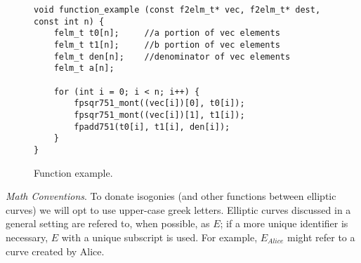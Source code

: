 \begin{figure}[!h]
\label{code:pbinv}
\begin{lstlisting}
void function_example (const f2elm_t* vec, f2elm_t* dest, const int n) {
	felm_t t0[n];     //a portion of vec elements
	felm_t t1[n];     //b portion of vec elements
	felm_t den[n];    //denominator of vec elements
	felm_t a[n];

	for (int i = 0; i < n; i++) {
		fpsqr751_mont((vec[i])[0], t0[i]);
		fpsqr751_mont((vec[i])[1], t1[i]);
		fpadd751(t0[i], t1[i], den[i]);
	}	
}
\end{lstlisting}
\caption{Function example.}
\end{figure}

\noindent
\textit{Math Conventions}. To donate isogonies (and other functions between elliptic curves) we will opt to use upper-case greek letters. Elliptic curves discussed in a general setting are refered to, when possible, as $E$; if a more unique identifier is necessary, $E$ with a unique subscript is used. For example, $E_{Alice}$ might refer to a curve created by Alice.  
